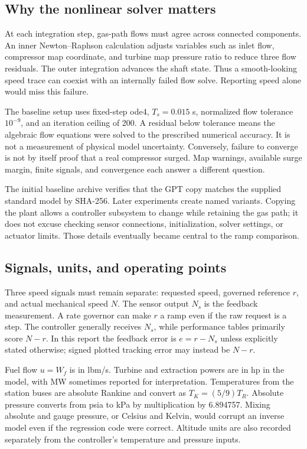 \subsection{Why the nonlinear solver matters}
At each integration step, gas-path flows must agree across connected components. An inner Newton--Raphson calculation adjusts variables such as inlet flow, compressor map coordinate, and turbine map pressure ratio to reduce three flow residuals. The outer integration advances the shaft state. Thus a smooth-looking speed trace can coexist with an internally failed flow solve. Reporting speed alone would miss this failure.

The baseline setup uses fixed-step ode4, $T_s=0.015$ s, normalized flow tolerance $10^{-9}$, and an iteration ceiling of 200. A residual below tolerance means the algebraic flow equations were solved to the prescribed numerical accuracy. It is not a measurement of physical model uncertainty. Conversely, failure to converge is not by itself proof that a real compressor surged. Map warnings, available surge margin, finite signals, and convergence each answer a different question.

The initial baseline archive verifies that the GPT copy matches the supplied standard model by SHA-256. Later experiments create named variants. Copying the plant allows a controller subsystem to change while retaining the gas path; it does not excuse checking sensor connections, initialization, solver settings, or actuator limits. Those details eventually became central to the ramp comparison.

\subsection{Signals, units, and operating points}
Three speed signals must remain separate: requested speed, governed reference $r$, and actual mechanical speed $N$. The sensor output $N_s$ is the feedback measurement. A rate governor can make $r$ a ramp even if the raw request is a step. The controller generally receives $N_s$, while performance tables primarily score $N-r$. In this report the feedback error is $e=r-N_s$ unless explicitly stated otherwise; signed plotted tracking error may instead be $N-r$.

Fuel flow $u=W_f$ is in lbm/s. Turbine and extraction powers are in hp in the model, with MW sometimes reported for interpretation. Temperatures from the station buses are absolute Rankine and convert as $T_K=(5/9)T_R$. Absolute pressure converts from psia to kPa by multiplication by 6.894757. Mixing absolute and gauge pressure, or Celsius and Kelvin, would corrupt an inverse model even if the regression code were correct. Altitude units are also recorded separately from the controller's temperature and pressure inputs.

